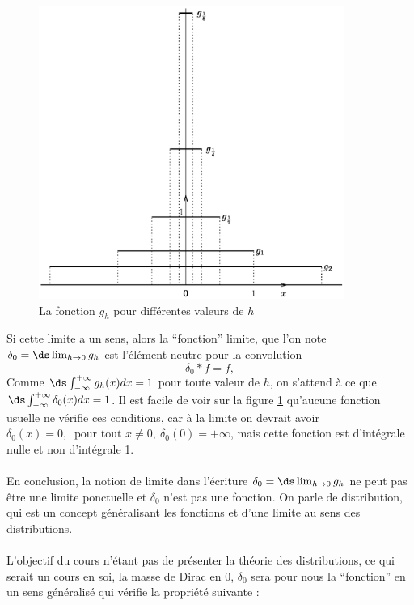 \begin{figure}[htbp]
  \begin{center}
    \includegraphics[width=10cm]{polyic2_dirac.eps}
  \end{center}
  \caption{La fonction $g_h$ pour différentes valeurs de $h$} \label{fig:dirac}
\end{figure}
Si cette limite a un sens, alors la ``fonction'' limite, que l'on note $\delta_0 = \ds \lim_{h \rightarrow 0} g_h$ est l'élément neutre pour la convolution
$$ \delta_0 * f = f, $$
Comme $\ds \int_{-\infty}^{+\infty} g_h(x)dx = 1$ pour toute valeur de $h$, on s'attend à ce que $\ds \int_{-\infty}^{+\infty} \delta_0(x) dx = 1$.
Il est facile de voir sur la figure \ref{fig:dirac} qu'aucune fonction usuelle ne vérifie ces conditions, car à la limite on devrait avoir $\delta_0(x) = 0,
 \ \text{ pour tout } x \ne 0, \ \delta_0(0) = +\infty$, mais cette fonction est d'intégrale nulle et non d'intégrale 1.\\ \\
En conclusion, la notion de limite dans l'écriture $\delta_0 = \ds \lim_{h \rightarrow 0} g_h$ ne peut pas être une limite ponctuelle et $\delta_0$ n'est pas une fonction. On parle de distribution, qui est un concept généralisant les fonctions et d'une limite au sens des distributions. \\ \\
L'objectif du cours n'étant pas de présenter la théorie des distributions, ce qui serait un cours en soi,
la masse de Dirac en $0$, $\delta_0$ sera pour nous la ``fonction'' en un sens généralisé qui vérifie la propriété suivante :
